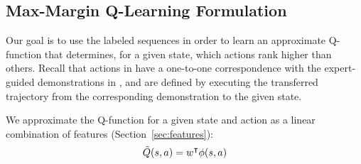 \subsection{Max-Margin Q-Learning Formulation}
Our goal is to use the labeled sequences  in order to learn an
approximate Q-function that determines, for a given state, which actions
rank higher than others.
Recall that actions in \actionset{} have a one-to-one correspondence with the
expert-guided demonstrations in \demoset{}, and are defined by executing the
transferred trajectory from the corresponding demonstration to the given state.

We approximate the Q-function for a given state \statevar{} and action
\actionvar{} as a linear combination of features \features{\statevar{}}{\actionvar{}}
(Section~\ref{sec:features}):
\begin{equation}
\tilde{Q}(s{}, a{}) = w^\intercal{} \phi({s{}}, {a{}})
\end{equation}

